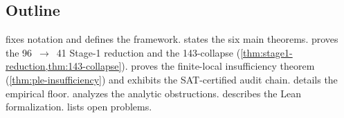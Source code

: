 \subsection{Outline}

 fixes notation and defines the framework.
 states the six main theorems. 
proves the 96~$\to$~41 Stage-1 reduction and the 143-collapse
(\cref{thm:stage1-reduction,thm:143-collapse}). 
proves the finite-local insufficiency theorem
(\cref{thm:ple-insufficiency}) and exhibits the SAT-certified audit
chain.  details the empirical floor.
 analyzes the analytic obstructions.
 describes the Lean formalization.
 lists open problems.

